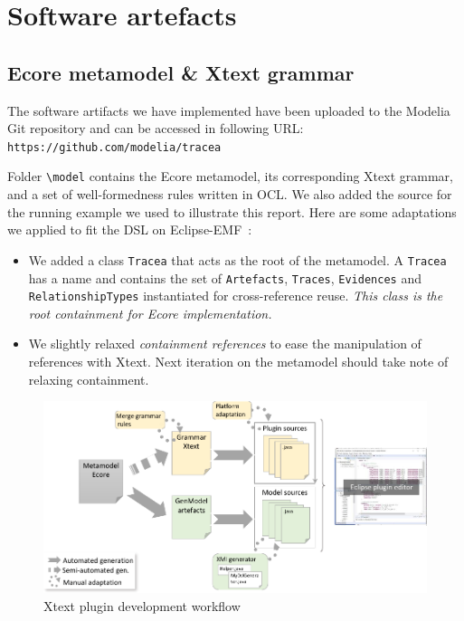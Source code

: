 \section{Software artefacts}
\subsection{Ecore metamodel \& Xtext grammar}
The software artifacts we have implemented have been uploaded to the Modelia Git repository \cite{Tracea_Repo} and can be accessed in following URL:
\verb|https://github.com/modelia/tracea|

Folder \verb|\model| contains the Ecore metamodel, its corresponding Xtext grammar, and a set of well-formedness rules written in OCL. We also added the source for the running example we used to illustrate this report. Here are some adaptations we applied to fit the DSL on Eclipse-EMF~\cite{EMF}:
\begin{itemize}
    \item We added a class \texttt{Tracea} that acts as the root of the metamodel. A \texttt{Tracea} has a name and contains the set of \texttt{Artefacts}, \texttt{Traces}, \texttt{Evidences} and \texttt{RelationshipTypes} instantiated for cross-reference reuse. \textit{This class is the root containment for Ecore implementation. }
    \item We slightly relaxed \textit{containment references} to ease the manipulation of references with Xtext. Next iteration on the metamodel should take note of relaxing containment.
\end{itemize}
  
\begin{figure}[h]
	\centering 
	\includegraphics[width=.99\linewidth]{images/xtext-workflow}
	\caption{Xtext plugin development workflow}
	\label{fig:xtext-workflow}
\end{figure}

